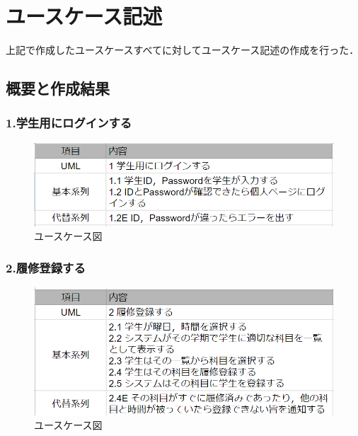\documentclass[documentclass]{jsarticle}
\begin{document}
\newpage

\section{ユースケース記述}
上記で作成したユースケースすべてに対してユースケース記述の作成を行った．
\subsection*{概要と作成結果}

\subsubsection*{1.学生用にログインする}

\begin{figure}[H]
  \begin{center}
    \includegraphics*[scale=0.6]{figure/4-1.png}
  \end{center}
  \caption{ユースケース図}
  \label{fig:4-1}
\end{figure}

\subsubsection*{2.履修登録する}
\begin{figure}[H]
  \begin{center}
    \includegraphics*[scale=0.6]{figure/4-2.png}
  \end{center}
  \caption{ユースケース図}
  \label{fig:4-2}
\end{figure}
\end{document}
